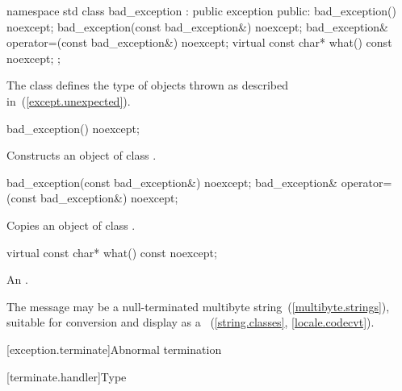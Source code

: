 %
\begin{codeblock}
namespace std {
  class bad_exception : public exception {
  public:
    bad_exception() noexcept;
    bad_exception(const bad_exception&) noexcept;
    bad_exception& operator=(const bad_exception&) noexcept;
    virtual const char* what() const noexcept;
  };
}
\end{codeblock}

\pnum
The class
defines the type of objects thrown as
described in~(\ref{except.unexpected}).

%
\begin{itemdecl}
bad_exception() noexcept;
\end{itemdecl}

\begin{itemdescr}
\pnum
\effects
Constructs an object of class
.
\end{itemdescr}

%
%
\begin{itemdecl}
bad_exception(const bad_exception&) noexcept;
bad_exception& operator=(const bad_exception&) noexcept;
\end{itemdecl}

\begin{itemdescr}
\pnum
\effects
Copies an object of class
.
\end{itemdescr}

%
\begin{itemdecl}
virtual const char* what() const noexcept;
\end{itemdecl}

\begin{itemdescr}
\pnum
\returns
An  \ntbs.%

\pnum
\notes
The message may be a null-terminated multibyte string~(\ref{multibyte.strings}),
suitable for conversion and display as a
~(\ref{string.classes}, \ref{locale.codecvt}).
\end{itemdescr}

[exception.terminate]{Abnormal termination}

[terminate.handler]{Type }

